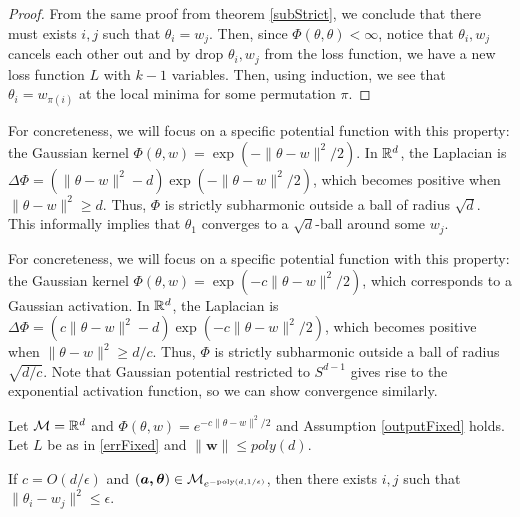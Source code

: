 \begin{proof}
From the same proof from theorem \ref{subStrict}, we conclude that there must exists $i, j$ such that $\theta_i = w_j$. Then, since $\Phi(\theta,\theta) < \infty$, notice that $\theta_i, w_j$ cancels each other out and by drop $\theta_i, w_j$ from the loss function, we have a new loss function $L$ with $k-1$ variables. Then, using induction, we see that $\theta_i = w_{\pi(i)}$ at the local minima for some permutation $\pi$.
\end{proof}


For concreteness, we will focus on a specific potential function with this property: the Gaussian kernel $\Phi(\theta, w) = \exp(-\|\theta - w\|^2/2)$. In ${\mathbb{R}}^d$, the Laplacian is $\Delta \Phi = ( \|\theta - w\|^2 -d ) \exp(-\|\theta - w\|^2/2)$, which becomes positive when $\|\theta - w \|^2 \geq d$. Thus, $\Phi$ is strictly subharmonic outside a ball of radius $\sqrt{d}$. This informally implies that $\theta_1$ converges to a $\sqrt{d}$-ball around some $w_j$. 





For concreteness, we will focus on a specific potential function with
this property: the Gaussian kernel $\Phi(\theta, w) = \exp(-c\|\theta
- w\|^2/2)$, which corresponds to a Gaussian activation. In ${\mathbb{R}}^d$, the Laplacian is $\Delta \Phi = ( c\|\theta - w\|^2 -d ) \exp(-c\|\theta - w\|^2/2)$, which becomes positive when
$\|\theta - w \|^2 \geq d/c$. Thus, $\Phi$ is strictly subharmonic
outside a ball of radius $\sqrt{d/c}$. Note that Gaussian potential
restricted to $S^{d-1}$ gives rise to the exponential activation
function, so we can show convergence similarly.  
%
\begin{theorem}\label{gaussStrict}
\label{GaussStrict}
Let $\mathcal{M} = {\mathbb{R}}^d$ and $\Phi(\theta,w) = e^{-c\|\theta-w\|^2/2}$ and Assumption \ref{outputFixed} holds. Let $L$ be as in \eqref{errFixed} and $\|\boldsymbol{w}\|\leq poly(d)$. 

If $c = O(d/\epsilon)$ and $(\boldsymbol{a,\theta}) \in \mathcal{M}_{e^{-\mathrm{poly}(d,1/\epsilon)}}$, then there exists $i, j$ such that $\| \theta_i - w_j \|^2 \leq \epsilon$.
\end{theorem}

